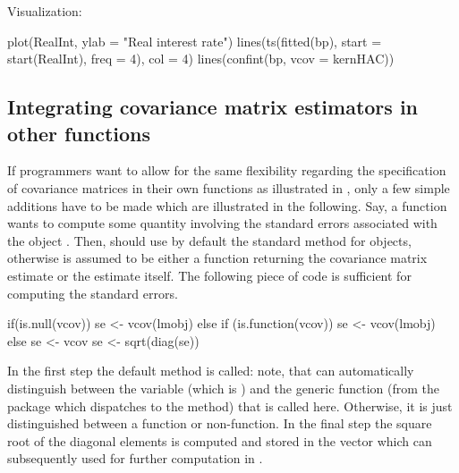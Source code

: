\documentclass{Z}
\begin{document}
\begin{appendix}
Visualization:
\begin{Schunk}
\begin{Sinput}
  plot(RealInt, ylab = "Real interest rate")
  lines(ts(fitted(bp), start = start(RealInt), freq = 4), col = 4)
  lines(confint(bp, vcov = kernHAC))
\end{Sinput}
\end{Schunk}

\subsection{Integrating covariance matrix estimators in other functions}

If programmers want to allow for the same flexibility regarding the specification
of covariance matrices in their own functions as illustrated in ,
only a few simple additions have to be made which are illustrated in the following.
Say, a function  wants to compute some quantity
involving the standard errors associated with the  object .
Then,  should use by default the standard  method for 
objects, otherwise  is assumed to be either a function returning the
covariance matrix estimate or the estimate itself.
The following piece of code is sufficient for computing the standard errors.
\begin{Sinput}
  if(is.null(vcov)) {
    se <- vcov(lmobj)
  } else {
    if (is.function(vcov)) 
      se <- vcov(lmobj)
    else
      se <- vcov
  }
  se <- sqrt(diag(se))
\end{Sinput}
In the first step the default method is called: note, that  can automatically
distinguish between the variable  (which is ) and the generic
function  (from the  package which dispatches to the 
method) that is called here. Otherwise, it is just distinguished between a function
or non-function. In the final step the square root of the diagonal elements is 
computed and stored in the vector  which can subsequently used for further
computation in .


\end{appendix}
\end{document}
